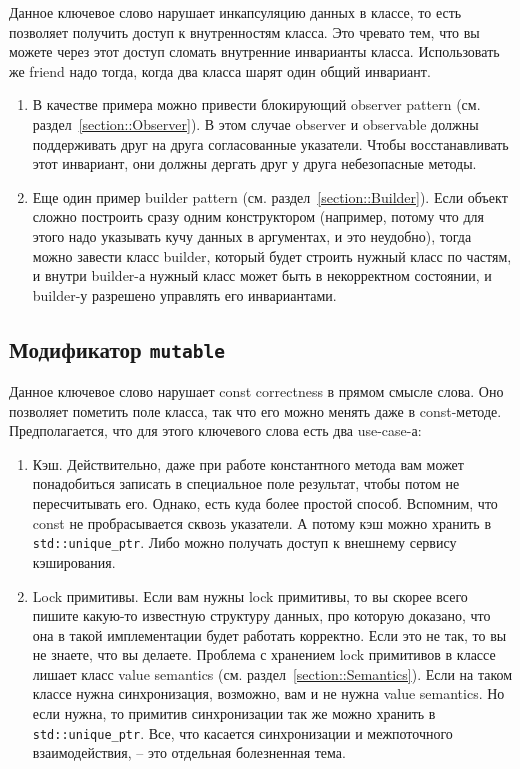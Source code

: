 Данное ключевое слово нарушает инкапсуляцию данных в классе, то есть позволяет получить доступ к внутренностям класса.
Это чревато тем, что вы можете через этот доступ сломать внутренние инварианты класса.
Использовать же friend надо тогда, когда два класса шарят один общий инвариант.
\begin{enumerate}
\item В качестве примера можно привести блокирующий observer pattern (см. раздел~\ref{section::Observer}).
В этом случае observer и observable должны поддерживать друг на друга согласованные указатели. Чтобы восстанавливать этот инвариант, они должны дергать друг у друга небезопасные методы.

\item Еще один пример builder pattern (см. раздел~\ref{section::Builder}).
Если объект сложно построить сразу одним конструктором (например, потому что для этого надо указывать кучу данных в аргументах, и это неудобно), тогда можно завести класс builder, который будет строить нужный класс по частям, и внутри builder-а нужный класс может быть в некорректном состоянии, и builder-у разрешено управлять его инвариантами.
\end{enumerate}

\subsection{Модификатор \texttt{mutable}}

Данное ключевое слово нарушает const correctness в прямом смысле слова.
Оно позволяет пометить поле класса, так что его можно менять даже в const-методе.
Предполагается, что для этого ключевого слова есть два use-case-а:
\begin{enumerate}
\item Кэш.
Действительно, даже при работе константного метода вам может понадобиться записать в специальное поле результат, чтобы потом не пересчитывать его.
Однако, есть куда более простой способ.
Вспомним, что const не пробрасывается сквозь указатели.
А потому кэш можно хранить в \verb"std::unique_ptr".
Либо можно получать доступ к внешнему сервису кэширования.

\item Lock примитивы.
Если вам нужны lock примитивы, то вы скорее всего пишите какую-то известную структуру данных, про которую доказано, что она в такой имплементации будет работать корректно.
Если это не так, то вы не знаете, что вы делаете.
Проблема с хранением lock примитивов в классе лишает класс value semantics (см. раздел~\ref{section::Semantics}).
Если на таком классе нужна синхронизация, возможно, вам и не нужна value semantics.
Но если нужна, то примитив синхронизации так же можно хранить в \verb"std::unique_ptr".
Все, что касается синхронизации и межпоточного взаимодействия, -- это отдельная болезненная тема.
\end{enumerate}


